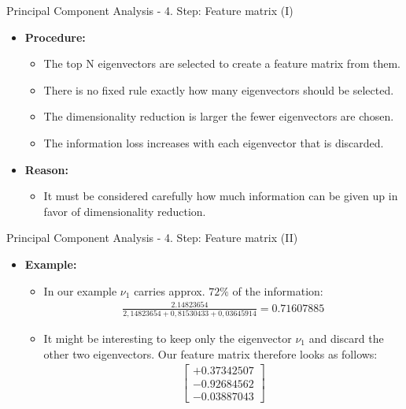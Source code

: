 \begin{frame}{Principal Component Analysis - 4. Step: Feature matrix (I)}
	\begin{itemize}
		\item \textbf{Procedure:}
		      \begin{itemize}
			      \item The top N eigenvectors are selected to create a feature
			            matrix from them.
			      \item There is no fixed rule exactly how many eigenvectors should
			            be selected.
			      \item The dimensionality reduction is larger the
			            fewer eigenvectors are chosen.
			      \item The information loss increases with each eigenvector that is
			            discarded.
		      \end{itemize}
		\item \textbf{Reason:}
		      \begin{itemize}
			      \item It must be considered carefully how much information can be
			            given up in favor of dimensionality reduction.
		      \end{itemize}
	\end{itemize}
\end{frame}

\begin{frame}{Principal Component Analysis - 4. Step: Feature matrix (II)}
	\begin{itemize}
		\item \textbf{Example:}
		      \begin{itemize}
			      \item In our example $\nu_1$ carries approx. $72\%$ of the
			            information: \\
			            \begin{align*}
				            \frac{2.14823654}{2,14823654+0,81530433+0,03645914} = 0.71607885
			            \end{align*}
			      \item It might be interesting to keep only the eigenvector $\nu_1$
			            and discard the other two eigenvectors. Our feature matrix
			            therefore looks as follows:
			            \begin{align*}
				            \begin{bmatrix} +0.37342507 \\ -0.92684562 \\ -0.03887043 \end{bmatrix}
			            \end{align*}
		      \end{itemize}
	\end{itemize}
\end{frame}

